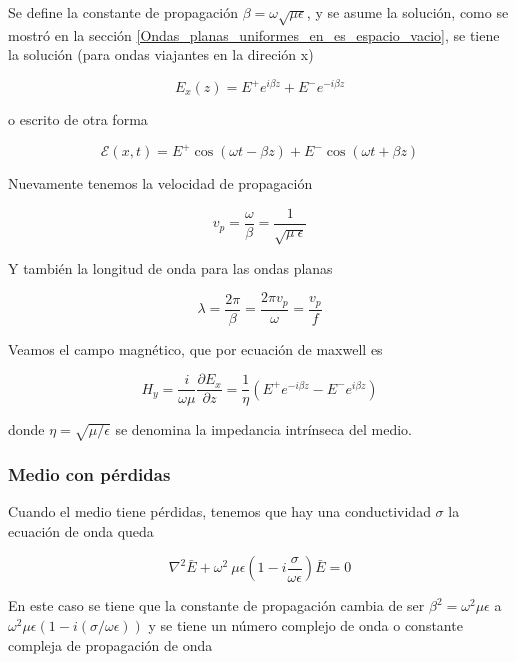 Se define la constante de propagación $\beta=\omega \sqrt{\mu \epsilon}$, y se asume la solución, como se mostró en la sección \ref{Ondas_planas_uniformes_en_es_espacio_vacio}, se tiene la solución (para ondas viajantes en la direción x)

\begin{equation*}
E_x(z) = E^+ e^{i \beta z} + E^- e^{-i \beta z}
\end{equation*}

o escrito de otra forma

\begin{equation*}
\mathcal{E} (x,t) = E^+ \cos (\omega t - \beta z) + E^- \cos (\omega t + \beta z)
\end{equation*}

Nuevamente tenemos la velocidad de propagación

\begin{equation*}
v_p = \frac{\omega}{\beta} = \frac{1}{\sqrt{\mu \ \epsilon}}
\end{equation*}

Y también la longitud de onda para las ondas planas

\begin{equation*}
\lambda = \frac{2 \pi}{\beta} = \frac{2 \pi v_p}{\omega } = \frac{v_p}{f}
\end{equation*}

Veamos el campo magnético, que por ecuación de maxwell es

\begin{equation*}
H_y = \frac{i}{\omega \mu} \frac{\partial E_x}{\partial z} = \frac{1}{\eta} (  E^+ e^{-i \beta z} - E^- e^{i \beta z} )
\end{equation*}

donde $\eta = \sqrt{\mu / \epsilon}$ se denomina la impedancia intrínseca del medio.

\subsubsection*{Medio con pérdidas}

Cuando el medio tiene pérdidas, tenemos que hay una conductividad $\sigma$ la ecuación de onda queda

\begin{equation*}
\nabla^2 \bar{E} + \omega^2 \ \mu \epsilon \left( 1 - i \frac{\sigma}{\omega \epsilon} \right) \bar{E} = 0
\end{equation*}

En este caso se tiene que la constante de propagación cambia de ser $\beta^2=\omega^2 \mu \epsilon$ a $\omega^2 \mu \epsilon (1-i(\sigma/\omega \epsilon))$ y se tiene un número complejo de onda o constante compleja de propagación de onda

